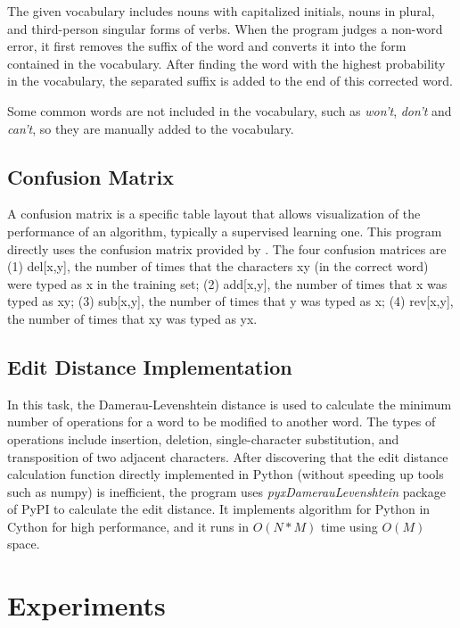 \documentclass{article}
\begin{document}
The given vocabulary includes nouns with capitalized initials, nouns
in plural, and third-person singular forms of verbs. When the program
judges a non-word error, it first removes the suffix of the word and
converts it into the form contained in the vocabulary. After finding
the word with the highest probability in the vocabulary, the separated
suffix is added to the end of this corrected word.

Some common words are not included in the vocabulary, such as \textit{won't},
\textit{don't} and \textit{can't}, so they are manually added to the
vocabulary.

\subsection{Confusion Matrix}

A confusion matrix is a specific table layout that allows visualization of the performance of an algorithm, typically a supervised learning one. 
This program directly uses the confusion matrix provided by \cite{kernighan1990spelling}.
The four confusion matrices are (1) del{[}x,y{]}, the number of times that the characters xy (in the correct word) were typed as x in the training set; (2) add{[}x,y{]}, the number of times that x was typed as xy; (3) sub{[}x,y{]}, the number of times that y was typed as x; (4) rev{[}x,y{]}, the number of times that xy was typed as yx.

\subsection{Edit Distance Implementation}

In this task, the Damerau-Levenshtein distance is used to calculate
the minimum number of operations for a word to be modified to another
word. The types of operations include insertion, deletion, single-character
substitution, and transposition of two adjacent characters. After
discovering that the edit distance calculation function directly implemented
in Python (without speeding up tools such as numpy) is inefficient,
the program uses \textit{pyxDamerauLevenshtein} package of PyPI to
calculate the edit distance. It implements algorithm for Python in
Cython for high performance, and it runs in $O(N*M)$ time using $O(M)$
space.

\section{Experiments}
\label{Experiments}
\end{document}
